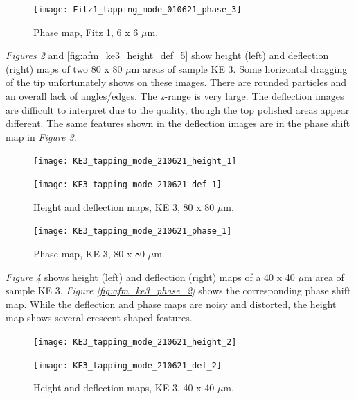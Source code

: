 \begin{figure}[H]
\centering
  \texttt{[image: Fitz1\_tapping\_mode\_010621\_phase\_3]}
\caption[Phase map, Fitz 1]{Phase map, Fitz 1, 6 x 6 $\mu$m.}
\label{fig:afm_fitz1_phase_3}
\end{figure}


\textit{Figures \ref{fig:afm_ke3_height_def_1}} and \ref{fig:afm_ke3_height_def_5} show height (left) and deflection (right) maps of two 80 x 80 $\mu$m areas of sample KE 3. Some horizontal dragging of the tip unfortunately shows on these images. There are rounded particles and an overall lack of angles/edges. The z-range is very large. The deflection images are difficult to interpret due to the quality, though the top polished areas appear different. The same features shown in the deflection images are in the phase shift map in \textit{Figure \ref{fig:afm_ke3_phase_1}}.

\begin{figure}[H]
\centering
\begin{minipage}{.45\textwidth}
  \centering
  \texttt{[image: KE3\_tapping\_mode\_210621\_height\_1]}
\end{minipage}
\begin{minipage}{.45\textwidth}
  \centering
  \texttt{[image: KE3\_tapping\_mode\_210621\_def\_1]}
\end{minipage}
\caption[Height and deflection maps, KE 3]{Height and deflection maps, KE 3, 80 x 80 $\mu$m.}
\label{fig:afm_ke3_height_def_1}
\end{figure}

\begin{figure}[H]
\centering
  \texttt{[image: KE3\_tapping\_mode\_210621\_phase\_1]}
\caption[Phase map, KE 3]{Phase map, KE 3, 80 x 80 $\mu$m.}
\label{fig:afm_ke3_phase_1}
\end{figure}

\textit{Figure \ref{fig:afm_ke3_height_def_2}} shows height (left) and deflection (right) maps of a 40 x 40 $\mu$m area of sample KE 3. \textit{Figure \ref{fig:afm_ke3_phase_2}} shows the corresponding phase shift map. While the deflection and phase maps are noisy and distorted, the height map shows several crescent shaped features.


\begin{figure}[H]
\centering
\begin{minipage}{.45\textwidth}
  \centering
  \texttt{[image: KE3\_tapping\_mode\_210621\_height\_2]}
\end{minipage}
\begin{minipage}{.45\textwidth}
  \centering
  \texttt{[image: KE3\_tapping\_mode\_210621\_def\_2]}
\end{minipage}
\caption[Height and deflection maps, KE 3]{Height and deflection maps, KE 3, 40 x 40 $\mu$m.}
\label{fig:afm_ke3_height_def_2}
\end{figure}

